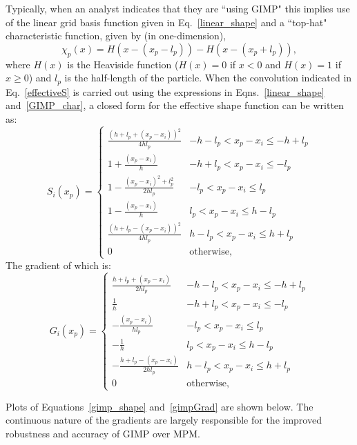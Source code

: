 Typically, when an analyst indicates that
they are ``using GIMP" this implies use of the linear grid basis function
given in Eq.~\ref{linear_shape} and a ``top-hat" characteristic function,
given by (in one-dimension),
\begin{equation}
\chi_p(x) = H(x-(x_p-l_p))-H(x-(x_p+l_p)) , \label{GIMP_char}
\end{equation}
where $H(x)$ is the Heaviside function
($H(x)=0$ if $x<0$ and $H(x)=1$ if $x\ge0$) and $l_p$ is the half-length
of the particle.  When the convolution indicated in Eq.~\ref{effectiveS}
is carried out using the expressions in Eqns.~\ref{linear_shape}
 and~\ref{GIMP_char}, a closed form for the effective shape function can be
written as:
\begin{equation}
S_{i}\left(x_p\right) = \begin{cases}
   \frac{\left(h+l_p+\left(x_p-x_i\right)\right)^2}{4hl_p} & {-h -l_p < x_p-x_i \le -h+l_p} \\
   1 + \frac{\left(x_p-x_i\right)}{h} & {-h + l_p < x_p-x_i \le -l_p} \\
   1 - \frac{\left(x_p-x_i\right)^2 + l_p^2}{2hl_p} & {-l_p < x_p-x_i \le l_p} \\
   1 - \frac{\left(x_p-x_i\right)}{h} & {l_p  < x_p-x_i \le h-l_p} \\
   \frac{\left(h+l_p-\left(x_p-x_i\right)\right)^2}{4hl_p} & {h -l_p < x_p-x_i \le h+l_p} \\
   0 & \text{otherwise},
\end{cases}
\label{gimp_shape}
\end{equation}
%
The gradient of which is:
\begin{equation}
G_i(x_p) = \begin{cases}
   \frac{h+l_p+\left(x_p-x_i\right)}{2 h l_p} & {-h -l_p < x_p-x_i \le -h+l_p} \\
   \frac{1}{h} & {-h + l_p < x_p-x_i \le -l_p} \\
   - \frac{\left(x_p-x_i\right)}{h l_p} & {-l_p < x_p-x_i \le l_p} \\
   - \frac{1}{h} & {l_p  < x_p-x_i \le h-l_p} \\
   - \frac{h+l_p-\left(x_p-x_i\right)}{2 h l_p} & {h -l_p < x_p-x_i \le h+l_p} \\
   0 & \text{otherwise},
\end{cases}
\label{gimpGrad}
\end{equation}

Plots of Equations~\ref{gimp_shape} and~\ref{gimpGrad} are shown
below.  The continuous nature of the gradients are largely responsible
for the improved robustness and accuracy of GIMP over MPM.

